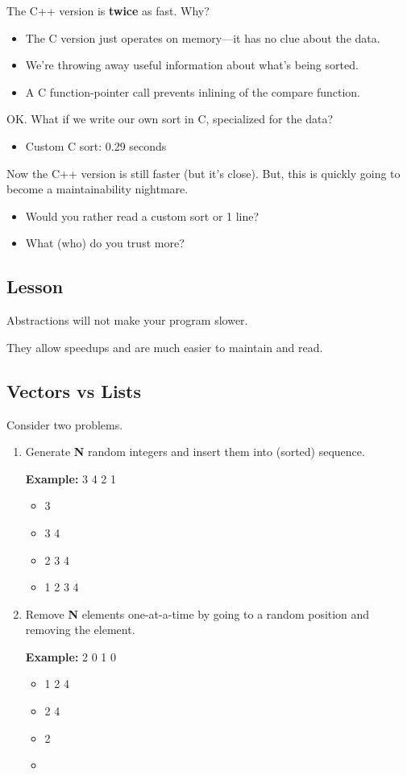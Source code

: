 \documentclass[a4paper]{report}
\begin{document}
The C++ version is {\bf twice} as fast. Why?
      \begin{itemize}
        \item The C version just operates on memory---it has no clue about the
          data.
        \item We're throwing away useful information about what's being sorted.
        \item A C function-pointer call prevents inlining of the compare function.
      \end{itemize}
OK. What if we write our own sort in C, specialized for the data?

\begin{itemize}
\item Custom C sort: 0.29 seconds
\end{itemize}

Now the C++ version is still faster (but it's close). But, this is
quickly going to become a maintainability nightmare.
      \begin{itemize}
        \item Would you rather read a custom sort or 1 line?
        \item What (who) do you trust more?
      \end{itemize}

\subsection*{Lesson}
Abstractions will not make your program slower. 

\noindent
They allow speedups and are much easier to maintain and read.

\subsection*{Vectors vs Lists}
Consider two
problems.

\begin{enumerate}
\item Generate {\bf N} random integers and insert them into (sorted)
      sequence.
      
      {\bf Example:} 3 4 2 1
      
      \begin{itemize}
        \item 3
        \item 3 4
        \item 2 3 4
        \item 1 2 3 4
      \end{itemize}

\item Remove {\bf N} elements one-at-a-time by going to a random position
      and removing the element.

      {\bf Example:} 2 0 1 0
      
      \begin{itemize}
        \item 1 2 4
        \item 2 4
        \item 2
        \item 
      \end{itemize}
\end{enumerate}
\end{document}
